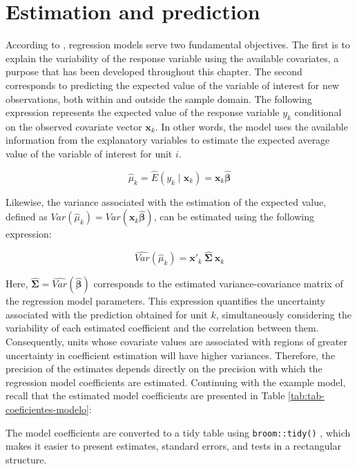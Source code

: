 \documentclass[
  english,
  12pt,
]{book}
\begin{document}
\section{Estimation and prediction}\label{estimacion-y-prediccion}

According to \citet{heeringa2017applied}, regression models serve two fundamental objectives. The first is to explain the variability of the response variable using the available covariates, a purpose that has been developed throughout this chapter. The second corresponds to predicting the expected value of the variable of interest for new observations, both within and outside the sample domain. The following expression represents the expected value of the response variable \(y_k\) conditional on the observed covariate vector \(\mathbf{x}_{k}\). In other words, the model uses the available information from the explanatory variables to estimate the expected average value of the variable of interest for unit \(i\).

\[
\hat \mu_k = \hat{E}(y_{k}\mid\mathbf{x}_{k})=\mathbf{x}_{k}\hat{\boldsymbol{\beta}}
\]

Likewise, the variance associated with the estimation of the expected value, defined as \({Var}(\hat{\mu}_k) = {Var}(\mathbf{x}_{k}\hat{\boldsymbol{\beta}})\), can be estimated using the following expression:

\[
\widehat{Var}(\hat \mu_k) =
\mathbf{x}'_{k}\ \hat{\boldsymbol{\Sigma}}\ \mathbf{x}_{k}
\]

Here, \(\hat{\boldsymbol{\Sigma}}=\widehat{Var}(\hat{\boldsymbol{\beta}})\) corresponds to the estimated variance-covariance matrix of the regression model parameters. This expression quantifies the uncertainty associated with the prediction obtained for unit \(k\), simultaneously considering the variability of each estimated coefficient and the correlation between them. Consequently, units whose covariate values are associated with regions of greater uncertainty in coefficient estimation will have higher variances. Therefore, the precision of the estimates depends directly on the precision with which the regression model coefficients are estimated. Continuing with the example model, recall that the estimated model coefficients are presented in Table \ref{tab:tab-coeficientes-modelo}:

The model coefficients are converted to a tidy table using \texttt{broom::tidy()} \citep{broom2026}, which makes it easier to present estimates, standard errors, and tests in a rectangular structure.
\end{document}
